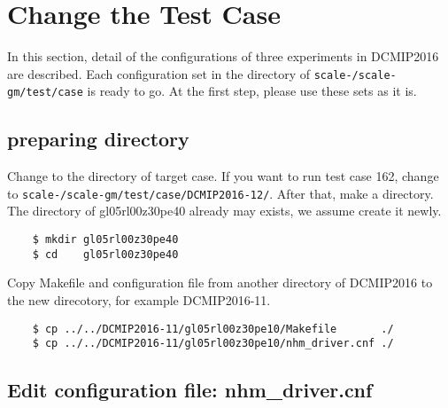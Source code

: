 

\section{Change the Test Case}

 \noindent In this section, detail of the configurations of three experiments
 in DCMIP2016 are described. Each configuration set in the directory of \texttt{scale-{\version}/scale-gm/test/case}
 is ready to go. At the first step, please use these sets as it is.

\subsection{preparing directory}
 Change to the directory of target case. If you want to run test case 162,
 change to \texttt{scale-{\version}/scale-gm/test/case/DCMIP2016-12/}. After that, make a directory.
 The directory of gl05rl00z30pe40 already may exists, we assume create it newly.
 \begin{verbatim}
    $ mkdir gl05rl00z30pe40
    $ cd    gl05rl00z30pe40
 \end{verbatim}

 \noindent Copy Makefile and configuration file from another directory
 of DCMIP2016 to the new direcotory, for example DCMIP2016-11.
 \begin{verbatim}
    $ cp ../../DCMIP2016-11/gl05rl00z30pe10/Makefile       ./
    $ cp ../../DCMIP2016-11/gl05rl00z30pe10/nhm_driver.cnf ./
 \end{verbatim}

\subsection{Edit configuration file: nhm\_driver.cnf}

 \vspace{0.5cm}

